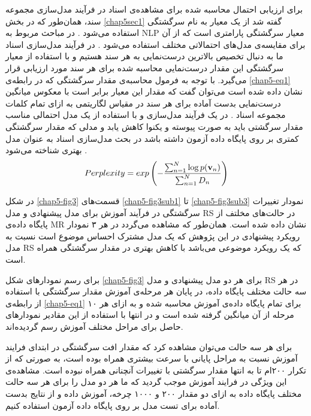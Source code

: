 برای ارزیابی احتمال محاسبه شده برای مشاهده‌ی اسناد در فرآیند مدل‌سازی مجموعه سند، همان‌طور که در بخش 
\ref{chap5sec1}
گفته شد از یک معیار به نام سرگشتگی استفاده می‌‌شود
\cite{blei2003latent}.
در مباحث مربوط به 
NLP
معیار سرگشتگی پارامتری است که از آن برای مقایسه‌ی مدل‌های احتمالاتی مختلف استفاده می‌شود
\cite{blei2003latent}.
 در فرآیند مدل‌سازی اسناد ما به دنبال تخصیص بالاترین درست‌نمایی به هر سند هستیم و با استفاده از معیار سرگشتگی این مقدار درست‌نمایی 
 محاسبه ‌شده برای هر سند مورد ارزیابی قرار می‌‌گیرد. با توجه به فرمول محاسبه‌ی مقدار سرگشتگی که در رابطه‌ی
\ref{chap5-eq1}
نشان داده شده است می‌‌توان گفت که مقدار این معیار برابر است با معکوس میانگین درست‌نمایی بدست آماده برای هر سند در مقیاس لگاریتمی به ازای تمام کلمات مجموعه اسناد
\cite{blei2003latent}.
 در یک فرآیند مدل‌سازی و با استفاده از یک مدل احتمالی‌ مناسب مقدار سرگشتی باید به صورت پیوسته و یکنوا کاهش یابد و مدلی که مقدار سرگشتگی کمتری بر روی پایگاه داده آزمون داشته باشد در بحث مدل‌سازی اسناد به عنوان مدل بهتری شناخته می‌‌شود
\cite{blei2003latent}.
\begin{align}
	\centering
	\label{chap5-eq1}
	Perplexity = exp\left( - \dfrac{\sum_{n=1}^{N}\log p(\textbf{v}_n)}{\sum_{n=1}^{N}D_n} \right)
\end{align}

در شکل 
\ref{chap5-fig3}
قسمت‌های
\ref{chap5-fig3sub1}
 تا
 \ref{chap5-fig3sub3}
  نمودار تغییرات سرگشتگی در فرآیند آموزش برای مدل پیشنهادی و مدل 
RS
در حالت‌های مخلتف از پایگاه داده‌ی 
MR
نشان داده شده است. همان‌طور که مشاهده می‌‌گردد در هر ۳ نمودار رویکرد پیشنهادی در این پژوهش که یک مدل مشترک احساس موضوع است نسبت به مدل 
RS
که یک رویکرد موضوعی می‌‌باشد با کاهش بهتری در مقدار سرگشتگی همراه است. 

برای رسم نمودارهای شکل
\ref{chap5-fig3}
برای هر دو مدل پیشنهادی و مدل
RS
در هر سه‌ حالت مختلف پایگاه داده، در پایان هر مرحله‌ی آموزش مقدار سرگشتگی با استفاده از رابطه‌ی
\ref{chap5-eq1}
برای تمام پایگاه داده‌ی ‌آموزش محاسبه شده و به ازای هر ۱۰ مرحله از آن میانگین گرفته شده است و در انتها با استفاده از این مقادیر نمودارهای حاصل برای مراحل مختلف آموزش رسم گردیده‌اند.

برای هر سه حالت می‌‌توان مشاهده کرد که مقدار افت سرگشتگی در ابتدای فرایند آموزش نسبت به مراحل پایانی با سرعت بیشتری همراه بوده است، به صورتی‌ که از تکرار ۲۰۰ام تا به انتها مقدار سرگشتی با تغییرات آنچنانی همراه نبوده است. مشاهده‌ی این ویژگی‌ در فرایند آموزش موجب گردید که ما هر دو مدل را برای هر سه حالت مختلف پایگاه داده به ازای دو مقدار ۲۰۰ و ۱۰۰۰ چرخه‌، آموزش داده و از نتایج بدست آماده برای تست مدل بر روی پایگاه داده آزمون استفاده کنیم. 


